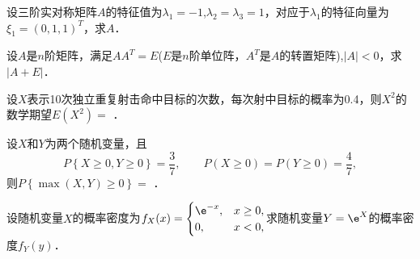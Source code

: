 \documentclass[plain,noanswer,medmath]{../../template/jnuexam}
\begin{document}

\begin{problem}
设三阶实对称矩阵$A$的特征值为$\lambda_1 = - 1$,$\lambda_2 = \lambda_3 = 1$，对应于$\lambda_1$的特征向量为$\xi_1 = (0,1,1)^T$，求$A$．
\end{problem}



\begin{problem}
设$A$是$n$阶矩阵，满足$AA^T = E$($E$是$n$阶单位阵，$A^T$是$A$的转置矩阵),$|A| < 0$，求$\left| A + E \right|$．
\end{problem}




\begin{problem}
设$X$表示10次独立重复射击命中目标的次数，每次射中目标的概率为0.4，则$X^2$的数学期望$E(X^2) =$ \fillin{}．
\end{problem}


\begin{problem}
设$X$和$Y$为两个随机变量，且
$$P\left\{X \ge 0,Y \ge 0 \right\} = \frac{3}{7},
\qquad P(X \ge 0) = P(Y \ge 0) = \frac{4}{7},$$
则$P\left\{\max(X,Y) \ge 0 \right\} =$ \fillin{}．
\end{problem}



\begin{problem}
设随机变量$X$的概率密度为$f_X(x) = \begin{cases}
 \e^{-x}, & x \ge 0,\\
 0, & x < 0,
\end{cases}$求随机变量$Y = \e^X$的概率密度$f_Y(y)$．
\end{problem}
\end{document}
